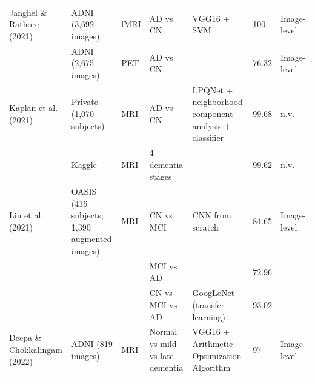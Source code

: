 \begin{table}[t]
\begin{tabular}{L{2.0cm} L{3.1cm} L{1.4cm} L{2.3cm} L{3.7cm} L{0.9cm} L{2.0cm}}
    Janghel \& Rathore (2021) & ADNI (3,692 images) & fMRI & AD vs CN & VGG16 + SVM & 100 & Image-level \\
     & ADNI (2,675 images) & PET & AD vs CN & & 76.32 & Image-level \\
    \addlinespace[2pt]
    Kaplan et al. (2021) & Private (1,070 subjects) & MRI & AD vs CN & LPQNet + neighborhood component analysis + classifier & 99.68 & n.v. \\
     & Kaggle & MRI & 4 dementia stages & & 99.62 & n.v. \\
    \addlinespace[2pt]
    Liu et al. (2021) & OASIS (416 subjects; 1,390 augmented images) & MRI & CN vs MCI & CNN from scratch & 84.65 & Image-level \\
     & & & MCI vs AD & & 72.96 & \\
     & & & CN vs MCI vs AD & GoogLeNet (transfer learning) & 93.02 & \\
    \addlinespace[2pt]
    Deepa \& Chokkalingam (2022) & ADNI (819 images) & MRI & Normal vs mild vs late dementia & VGG16 + Arithmetic Optimization Algorithm & 97 & Image-level \\
    \addlinespace[2pt]

\end{tabular}
\end{table}
